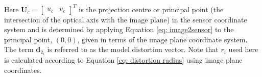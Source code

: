 \documentclass[12pt,oneside,openany,a4paper, %
english, %
masters-t, goldenblock]{usthesis}
\begin{document}
Here $\bm{U}_c = \begin{bmatrix} u_c & v_c \end{bmatrix}^T$ is the projection centre or principal point (the intersection of the optical axis with the image plane) in the sensor coordinate system and is determined by applying Equation \ref{eq: image2sensor} to the principal point, $(0,0)$, given in terms of the image plane coordinate system. The term $\bm{d}_{2_i}$ is referred to as the model distortion vector. Note that $r_i$ used here is calculated according to Equation \ref{eq: distortion radius} using image plane coordinates.
\end{document}
